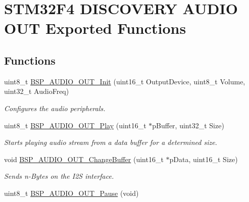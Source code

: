 \hypertarget{group___s_t_m32_f4___d_i_s_c_o_v_e_r_y___a_u_d_i_o___o_u_t___exported___functions}{}\section{S\+T\+M32\+F4 D\+I\+S\+C\+O\+V\+E\+RY A\+U\+D\+IO O\+UT Exported Functions}
\label{group___s_t_m32_f4___d_i_s_c_o_v_e_r_y___a_u_d_i_o___o_u_t___exported___functions}
\subsection*{Functions}
\begin{DoxyCompactItemize}
\item 
uint8\+\_\+t \mbox{\hyperlink{group___s_t_m32_f4___d_i_s_c_o_v_e_r_y___a_u_d_i_o___o_u_t___exported___functions_gae713c698a93ff492424c6a8363f53bcc}{B\+S\+P\+\_\+\+A\+U\+D\+I\+O\+\_\+\+O\+U\+T\+\_\+\+Init}} (uint16\+\_\+t Output\+Device, uint8\+\_\+t Volume, uint32\+\_\+t Audio\+Freq)
\begin{DoxyCompactList}\small\item\em Configures the audio peripherals. \end{DoxyCompactList}\item 
uint8\+\_\+t \mbox{\hyperlink{group___s_t_m32_f4___d_i_s_c_o_v_e_r_y___a_u_d_i_o___o_u_t___exported___functions_gaa415fdd481a01468fdfcd9d91f0f6711}{B\+S\+P\+\_\+\+A\+U\+D\+I\+O\+\_\+\+O\+U\+T\+\_\+\+Play}} (uint16\+\_\+t $\ast$p\+Buffer, uint32\+\_\+t Size)
\begin{DoxyCompactList}\small\item\em Starts playing audio stream from a data buffer for a determined size. \end{DoxyCompactList}\item 
void \mbox{\hyperlink{group___s_t_m32_f4___d_i_s_c_o_v_e_r_y___a_u_d_i_o___o_u_t___exported___functions_gacbc557827ebf62fdd9a0ceb21fd89b2b}{B\+S\+P\+\_\+\+A\+U\+D\+I\+O\+\_\+\+O\+U\+T\+\_\+\+Change\+Buffer}} (uint16\+\_\+t $\ast$p\+Data, uint16\+\_\+t Size)
\begin{DoxyCompactList}\small\item\em Sends n-\/\+Bytes on the I2S interface. \end{DoxyCompactList}\item 
uint8\+\_\+t \mbox{\hyperlink{group___s_t_m32_f4___d_i_s_c_o_v_e_r_y___a_u_d_i_o___o_u_t___exported___functions_ga73a0f92b8adbfb2e8207067434c2bfef}{B\+S\+P\+\_\+\+A\+U\+D\+I\+O\+\_\+\+O\+U\+T\+\_\+\+Pause}} (void)

\end{DoxyCompactItemize}
